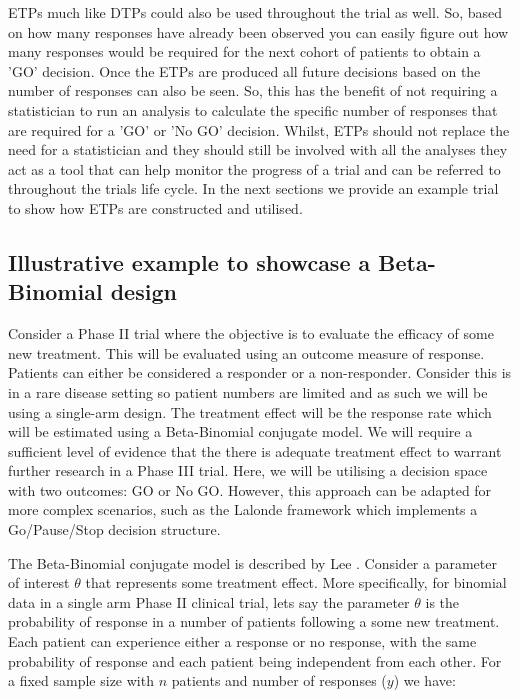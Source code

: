 ETPs much like DTPs could also be used throughout the trial as well. So, based on how many responses have already been observed you can easily figure out how many responses would be required for the next cohort of patients to obtain a 'GO' decision. Once the ETPs are produced all future decisions based on the number of responses can also be seen. So, this has the benefit of not requiring a statistician to run an analysis to calculate the specific number of responses that are required for a 'GO' or 'No GO' decision. Whilst, ETPs should not replace the need for a statistician and they should still be involved with all the analyses they act as a tool that can help monitor the progress of a trial and can be referred to throughout the trials life cycle. In the next sections we provide an example trial to show how ETPs are constructed and utilised. 


\subsection{Illustrative example to showcase a Beta-Binomial design} 
\label{etp:BBIllEx}

Consider a Phase \RN{2} trial where the objective is to evaluate the efficacy of some new treatment. This will be evaluated using an outcome measure of response. Patients can either be considered a responder or a non-responder. Consider this is in a rare disease setting so patient numbers are limited and as such we will be using a single-arm design. The treatment effect will be the response rate which will be estimated using a Beta-Binomial conjugate model. We will require a sufficient level of evidence that the there is adequate treatment effect to warrant further research in a Phase \RN{3} trial. Here, we will be utilising a decision space with two outcomes: GO or No GO. However, this approach can be adapted for more complex scenarios, such as the Lalonde framework \cite{lalondeModelbasedDrugDevelopment2007} which implements a Go/Pause/Stop decision structure. 

The Beta-Binomial conjugate model is described by Lee \cite{leeBayesianStatisticsIntroduction2012}. Consider a parameter of interest $\theta$ that represents some treatment effect. More specifically, for binomial data in a single arm Phase \RN{2} clinical trial, lets say the parameter $\theta$ is the probability of response in a number of patients following a some new treatment. Each patient can experience either a response or no response, with the same probability of response and each patient being independent from each other. For a fixed sample size with $n$ patients and number of responses ($y$) we have: 

